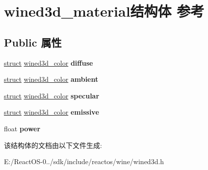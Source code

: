 \hypertarget{structwined3d__material}{}\section{wined3d\+\_\+material结构体 参考}
\label{structwined3d__material}
\subsection*{Public 属性}
\begin{DoxyCompactItemize}
\item 
\mbox{\label{structwined3d__material_a8467e40bf2c47c55d9385818c1a5c76e}} 
\hyperlink{interfacestruct}{struct} \hyperlink{structwined3d__color}{wined3d\+\_\+color} {\bfseries diffuse}
\item 
\mbox{\label{structwined3d__material_a5f0b26865826fc884707fa9dcf8b79a8}} 
\hyperlink{interfacestruct}{struct} \hyperlink{structwined3d__color}{wined3d\+\_\+color} {\bfseries ambient}
\item 
\mbox{\label{structwined3d__material_a5ce982dd5d15c49343d71c8509eebb62}} 
\hyperlink{interfacestruct}{struct} \hyperlink{structwined3d__color}{wined3d\+\_\+color} {\bfseries specular}
\item 
\mbox{\label{structwined3d__material_ac0ddebb4f9413cd7a5a38b94e0abcdf6}} 
\hyperlink{interfacestruct}{struct} \hyperlink{structwined3d__color}{wined3d\+\_\+color} {\bfseries emissive}
\item 
\mbox{\label{structwined3d__material_a8c02e7786ac7694e0e357162e6f4305e}} 
float {\bfseries power}
\end{DoxyCompactItemize}


该结构体的文档由以下文件生成\+:\begin{DoxyCompactItemize}
\item 
E\+:/\+React\+O\+S-\/0../sdk/include/reactos/wine/wined3d.\+h\end{DoxyCompactItemize}
